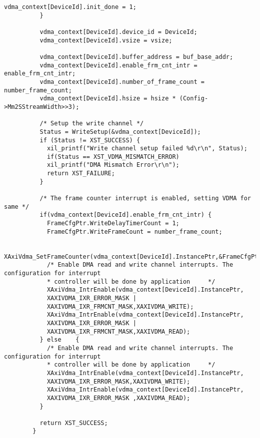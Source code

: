 \begin{lstlisting}[style=C]
            vdma_context[DeviceId].init_done = 1;
          }

          vdma_context[DeviceId].device_id = DeviceId;
          vdma_context[DeviceId].vsize = vsize;

          vdma_context[DeviceId].buffer_address = buf_base_addr;
          vdma_context[DeviceId].enable_frm_cnt_intr = enable_frm_cnt_intr;
          vdma_context[DeviceId].number_of_frame_count = number_frame_count;
          vdma_context[DeviceId].hsize = hsize * (Config->Mm2SStreamWidth>>3);

          /* Setup the write channel */
          Status = WriteSetup(&vdma_context[DeviceId]);
          if (Status != XST_SUCCESS) {
            xil_printf("Write channel setup failed %d\r\n", Status);
            if(Status == XST_VDMA_MISMATCH_ERROR)
			xil_printf("DMA Mismatch Error\r\n");
            return XST_FAILURE;
          }

          /* The frame counter interrupt is enabled, setting VDMA for same */
          if(vdma_context[DeviceId].enable_frm_cnt_intr) {
            FrameCfgPtr.WriteDelayTimerCount = 1;
            FrameCfgPtr.WriteFrameCount = number_frame_count;

            XAxiVdma_SetFrameCounter(vdma_context[DeviceId].InstancePtr,&FrameCfgPtr);
            /* Enable DMA read and write channel interrupts. The configuration for interrupt
            * controller will be done by application	 */
            XAxiVdma_IntrEnable(vdma_context[DeviceId].InstancePtr,
            XAXIVDMA_IXR_ERROR_MASK |
            XAXIVDMA_IXR_FRMCNT_MASK,XAXIVDMA_WRITE);
            XAxiVdma_IntrEnable(vdma_context[DeviceId].InstancePtr,
            XAXIVDMA_IXR_ERROR_MASK |
            XAXIVDMA_IXR_FRMCNT_MASK,XAXIVDMA_READ);
          } else	{
            /* Enable DMA read and write channel interrupts. The configuration for interrupt
            * controller will be done by application	 */
            XAxiVdma_IntrEnable(vdma_context[DeviceId].InstancePtr,
            XAXIVDMA_IXR_ERROR_MASK,XAXIVDMA_WRITE);
            XAxiVdma_IntrEnable(vdma_context[DeviceId].InstancePtr,
            XAXIVDMA_IXR_ERROR_MASK ,XAXIVDMA_READ);
          }

          return XST_SUCCESS;
        }
\end{lstlisting}
\medskip